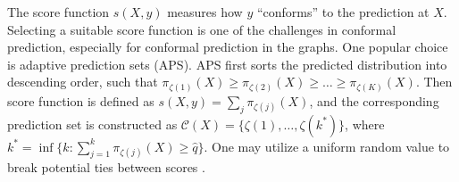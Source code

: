The score function $s(X, y)$ measures how $y$ ``conforms'' to the prediction at $X$.
Selecting a suitable score function is one of the challenges in conformal prediction, especially for conformal prediction in the graphs. 
% 
One popular choice is adaptive prediction sets (APS).
APS first sorts the predicted distribution into descending order, such that 
$\pi_{\zeta(1)}(X) \geq \pi_{\zeta(2)}(X) \geq \dots \geq \pi_{\zeta(K)}(X)$.
Then score function is defined as $s(X,y) = \sum_{j} \pi_{\zeta(j)}(X)$,
and the corresponding prediction set is constructed as $\mathcal{C}(X)=\{ \zeta(1), \dots, \zeta(k^\ast) \}$,
where $k^\ast=\inf\{ k: \sum_{j=1}^k \pi_{\zeta(j)}(X) \geq \hat{q} \}$.
% 
One may utilize a uniform random value to break potential ties between scores \cite{stutz2021learning}.

